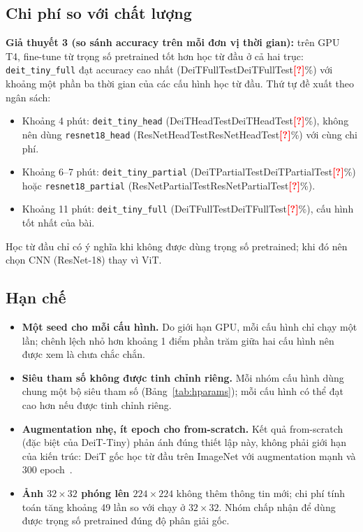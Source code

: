 \documentclass[12pt]{article}
\newcommand{\code}[1]{\texttt{#1}}
\newcommand{\st}[1]{\textbf{#1}}
\newcommand{\todo}[1]{\textcolor{red}{\textbf{[#1]}}}
\newcommand{\val}[1]{\ifcsname #1\endcsname\csname #1\endcsname\else\todo{?}\fi}
\begin{document}
\subsection{Chi phí so với chất lượng}
\st{Giả thuyết 3 (so sánh accuracy trên mỗi đơn vị thời gian):} trên GPU T4, fine-tune từ trọng số pretrained tốt hơn học
từ đầu ở cả hai trục: \code{deit\_tiny\_full} đạt accuracy cao nhất (\val{DeiTFullTest}\%) với khoảng một phần ba thời gian
của các cấu hình học từ đầu. Thứ tự đề xuất theo ngân sách:
\begin{itemize}
  \item Khoảng 4 phút: \code{deit\_tiny\_head} (\val{DeiTHeadTest}\%), không nên dùng \code{resnet18\_head}
        (\val{ResNetHeadTest}\%) với cùng chi phí.
  \item Khoảng 6--7 phút: \code{deit\_tiny\_partial} (\val{DeiTPartialTest}\%) hoặc \code{resnet18\_partial}
        (\val{ResNetPartialTest}\%).
  \item Khoảng 11 phút: \code{deit\_tiny\_full} (\val{DeiTFullTest}\%), cấu hình tốt nhất của bài.
\end{itemize}
Học từ đầu chỉ có ý nghĩa khi không được dùng trọng số pretrained; khi đó nên chọn CNN (ResNet-18) thay vì ViT.

\subsection{Hạn chế}
\begin{itemize}
  \item \st{Một seed cho mỗi cấu hình.} Do giới hạn GPU, mỗi cấu hình chỉ chạy một lần; chênh lệch nhỏ hơn khoảng
        1 điểm phần trăm giữa hai cấu hình nên được xem là chưa chắc chắn.
  \item \st{Siêu tham số không được tinh chỉnh riêng.} Mỗi nhóm cấu hình dùng chung một bộ siêu tham số
        (Bảng~\ref{tab:hparams}); mỗi cấu hình có thể đạt cao hơn nếu được tinh chỉnh riêng.
  \item \st{Augmentation nhẹ, ít epoch cho from-scratch.} Kết quả from-scratch (đặc biệt của DeiT-Tiny) phản ánh đúng
        thiết lập này, không phải giới hạn của kiến trúc: DeiT gốc học từ đầu trên ImageNet với augmentation mạnh và
        300 epoch~\cite{touvron2021}.
  \item \st{Ảnh $32\times32$ phóng lên $224\times224$} không thêm thông tin mới; chi phí tính toán tăng khoảng 49 lần so
        với chạy ở $32\times32$. Nhóm chấp nhận để dùng được trọng số pretrained đúng độ phân giải gốc.
\end{itemize}
\end{document}
